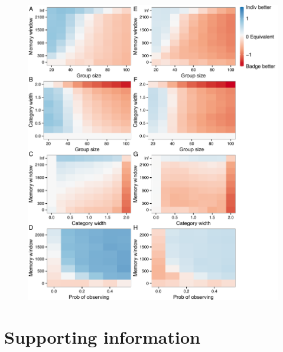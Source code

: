 \begin{figure}
\includegraphics[width=6.85in]{figures/cost_comparisons.pdf}
\caption{}
\end{figure}

\clearpage{}
\renewcommand{\thesection}{}
\section{Supporting information}
\renewcommand{\thesection}{S}
\renewcommand{\thesubsection}{S\arabic{subsection}}
\renewcommand{\theequation}{S\arabic{equation}}
\renewcommand{\thetable}{S\arabic{table}}
\renewcommand{\thefigure}{S\arabic{figure}}
\setcounter{equation}{0}  
\setcounter{figure}{0}
\setcounter{table}{0}

